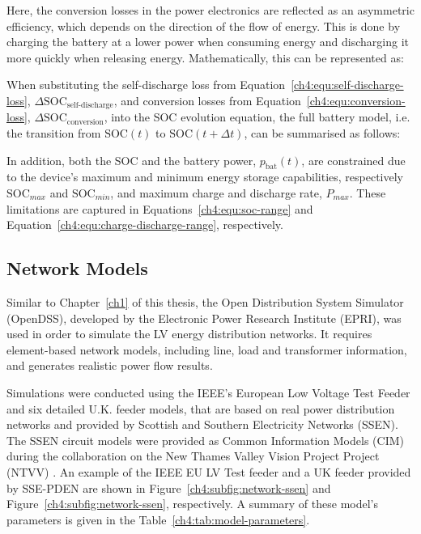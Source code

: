 

Here, the conversion losses in the power electronics are reflected as an asymmetric efficiency, which depends on the direction of the flow of energy.
This is done by charging the battery at a lower power when consuming energy and discharging it more quickly when releasing energy.
Mathematically, this can be represented as:



When substituting the self-discharge loss from Equation~\ref{ch4:equ:self-discharge-loss}, $\Delta\text{SOC}_\text{self-discharge}$, and conversion losses from Equation~\ref{ch4:equ:conversion-loss}, $\Delta\text{SOC}_\text{conversion}$, into the SOC evolution equation, the full battery model, i.e. the transition from $\text{SOC}(t)$ to $\text{SOC}(t+\Delta t)$, can be summarised as follows:



In addition, both the SOC and the battery power, $p_\text{bat}(t)$, are constrained due to the device's maximum and minimum energy storage capabilities, respectively $\text{SOC}_{max}$ and $\text{SOC}_{min}$, and maximum charge and discharge rate, $P_{max}$.
These limitations are captured in Equations~\ref{ch4:equ:soc-range} and Equation~\ref{ch4:equ:charge-discharge-range}, respectively.





\subsection{Network Models}
\label{ch4:subsec:network-models}

Similar to Chapter~\ref{ch1} of this thesis, the Open Distribution System Simulator (OpenDSS), developed by the Electronic Power Research Institute (EPRI), was used in order to simulate the LV energy distribution networks.
It requires element-based network models, including line, load and transformer information, and generates realistic power flow results.



Simulations were conducted using the IEEE's European Low Voltage Test Feeder \cite{EULVFeeder2015} and six detailed U.K. feeder models, that are based on real power distribution networks and provided by Scottish and Southern Electricity Networks (SSEN).
The SSEN circuit models were provided as Common Information Models (CIM) during the collaboration on the New Thames Valley Vision Project Project (NTVV) \cite{NTVV2016}.
An example of the IEEE EU LV Test feeder and a UK feeder provided by SSE-PDEN are shown in Figure~\ref{ch4:subfig:network-ssen} and Figure~\ref{ch4:subfig:network-ssen}, respectively.
A summary of these model's parameters is given in the Table~\ref{ch4:tab:model-parameters}.

